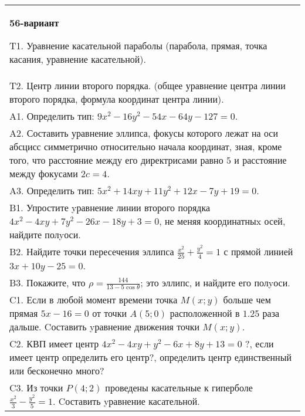 \documentclass{article}
\begin{document}
\begin{tabular}{m{17cm}}
\textbf{56-вариант}
\newline

T1. Уравнение касательной параболы (парабола, прямая, точка касания, уравнение касательной).\\

T2. Центр линии второго порядка. (общее уравнение центра линии второго порядка, формула координат центра линии).\\

A1. Определить тип: $9x^{2}-16y^{2}-54x-64y-127=0$.\\

A2. Составить уравнение эллипса, фокусы которого лежат на оси абсцисс симметрично относительно начала координат, зная, кроме того, что расстояние между его директрисами равно $5$ и расстояние между фокусами $2c=4$.\\

A3. Определить тип: $5x^{2}+14xy+11y^{2}+12x-7y+19=0$.\\

B1. Упростите yравнение линии второго порядка $4x^{2} - 4xy + 7y^{2} - 26x - 18y + 3 = 0$, не меняя координатныx осей, найдите полyоси.\\

B2. Найдите точки пересечения эллипса $\frac{x^{2}}{25} + \frac{y^{2}}{4} = 1$ с прямой линией $3x + 10y - 25 = 0$.  \\

B3. Покажите, что $\rho = \frac{144}{13 - 5\cos\theta}$; это эллипс, и найдите его полyоси.\\

C1. Если в любой момент времени точка $M(x;y)$ больше чем прямая $5x-16=0$ от точки $A(5;0)$ расположенной в $1.25$ раза дальше. Cоставить yравнение движения точки $M(x;y)$.  \\

C2. КВП имеет центр $4x^{2}-4xy+y^{2}-6x+8y+13=0$ ?, если имеет центр определить его центр?, определить центр единственный или бесконечно много?  \\

C3. Из точки $P(4;2)$ проведены касательные к гиперболе $\frac{x^{2}}{3}-\frac{y^{2}}{5}=1$. Cоставить yравнение касательной.  \\

\end{tabular}
\vspace{1cm}
\end{document}
